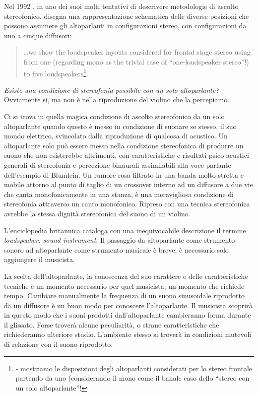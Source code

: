 Nel 1992 \mg, in uno dei suoi molti tentativi di descrivere
metodologie di ascolto stereofonico, disegna una rappresentazione schematica
delle diverse posizioni che possono assumere gli altoparlanti in
configurazioni stereo, con configurazioni da uno a cinque diffusori:

\begin{quote}
\ldots we show the loudspeaker layouts considered for frontal stage stereo
using from one (regarding mono as the trivial case of “one-loudspeaker stereo”!)
to five loudspeakers\footnote{\cite{mg:92pdmsss} - mostriamo le disposizioni
degli altoparlanti considerati per lo stereo frontale partendo da uno
(considerando il mono come il banale caso dello “stereo con un solo altoparlante”!}.
\end{quote}

\emph{Esiste una condizione di stereofonia possibile con un solo altoparlante?}
Ovviamente si, ma non è nella riproduzione del violino che la percepiamo.

Ci si trova in quella magica condizione di ascolto stereofonico da un solo
altoparlante quando questo è messo in condizione di suonare se stesso, il suo
mondo elettrico, svincolato dalla riproduzione di qualcosa di acustico. Un
altoparlante solo può essere messo nella condizione stereofonica di produrre un
suono che non esisterebbe altrimenti, con caratteristiche e risultati
psico-acustici generali di stereofonia e percezione binaurali assimilabili alla
voce parlante dell'esempio di Blumlein.
Un rumore rosa filtrato in una banda molto stretta e mobile attorno al punto di
taglio di un crossover interno ad un diffusore a due vie che canta
monofonicamente in una stanza, è una meravigliosa condizione di stereofonia
attraverso un canto monofonico. Ripreso con una tecnica stereofonica avrebbe la
stessa dignità stereofonica del suono di un violino.


L'enciclopedia britannica cataloga con una inequivocabile descrizione il termine
\emph{loudspeaker: sound instrument}. Il passaggio da altoparlante come strumento
sonoro ad altoparlante come strumento musicale è breve: è necessario solo
aggiungere il musicista.

La scelta dell'altoparlante, la conoscenza del suo carattere e delle caratteristiche
tecniche è un momento necessario per quel musicista, un momento che richiede tempo.
Cambiare manualmente la frequenza di un suono sinusoidale riprodotto da un diffusore è un
buon modo per conoscere l'altoparlante. Il musicista scoprirà in questo modo che i
suoni prodotti dall'altoparlante cambieranno forma durante il glissato. Forse
troverà alcune peculiarità, o strane caratteristiche che richiederanno ulteriore
studio. L'ambiente stesso si troverà in condizioni mutevoli di relazione con il suono riprodotto.

